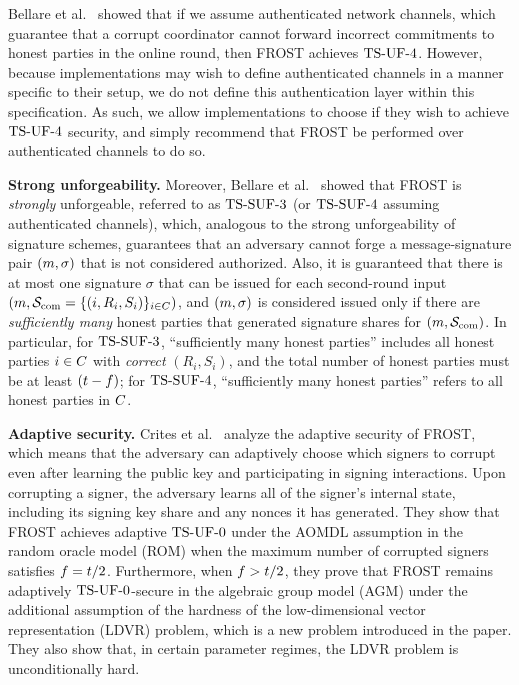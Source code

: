 Bellare et al.~\cite{BellareCKMTZ22} showed that if we assume authenticated network channels,  which guarantee that a corrupt coordinator cannot forward incorrect commitments to honest parties in the online round,
then FROST achieves $\mathrm{TS}\mbox{-}\mathrm{UF}\mbox{-}{4}$.
However, because implementations may wish to define authenticated channels in a manner specific to their setup,
we do not define this authentication layer within this specification.
As such,
we allow implementations to choose if they wish to achieve $\mathrm{TS}\mbox{-}\mathrm{UF}\mbox{-}{4}$ security,
and simply recommend that FROST be performed over authenticated channels to do so.

\medskip
\textbf{Strong unforgeability.} Moreover, Bellare et al.~\cite{BellareCKMTZ22} showed that FROST is \emph{strongly} unforgeable, referred to as $\mathrm{TS}\mbox{-}\mathrm{SUF}\mbox{-}{3}$ (or $\mathrm{TS}\mbox{-}\mathrm{SUF}\mbox{-}{4}$ assuming authenticated channels), which, analogous to the strong unforgeability of signature schemes, guarantees that an adversary cannot forge a message-signature pair $(m,\sigma)$ that is not considered  authorized.
Also, it is guaranteed that there is at most one signature $\sigma$ that can be issued for each second-round input $(m, \mathcal{S}_{\rm com}=\{ (i, R_{i}, S_{i})\}_{i \in C})$, and $(m, \sigma)$ is considered issued only if there are \emph{sufficiently many} honest parties that generated signature shares for $(m, \mathcal{S}_{\rm com})$.
In particular, for $\mathrm{TS}\mbox{-}\mathrm{SUF}\mbox{-}{3}$, ``sufficiently many honest parties'' includes all honest parties $i\in C$ with \emph{correct} $(R_{i}, S_{i})$, and the total number of honest parties must be at least $(t - f)$; for $\mathrm{TS}\mbox{-}\mathrm{SUF}\mbox{-}{4}$, ``sufficiently many honest parties'' refers to all honest parties in $C$.

\medskip
\textbf{Adaptive security.} Crites et al.~\cite{adp-frost} analyze the adaptive security of FROST, which means that the adversary can adaptively choose which signers to corrupt even after learning the public key and participating in signing interactions. Upon corrupting a signer, the adversary learns all of the signer's internal state, including its signing key share and any nonces it has generated. They show that FROST achieves adaptive $\mathrm{TS}\mbox{-}\mathrm{UF}\mbox{-}{0}$ under the AOMDL assumption in the random oracle model (ROM) when the maximum number of corrupted signers satisfies $f = t/2$. Furthermore, when $f > t/2$, they prove that FROST remains adaptively $\mathrm{TS}\mbox{-}\mathrm{UF}\mbox{-}{0}$-secure in the algebraic group model (AGM) under the additional assumption of the hardness of the low-dimensional vector representation (LDVR) problem, which is a new problem introduced in the paper. They also show that, in certain parameter regimes, the LDVR problem is unconditionally hard.



